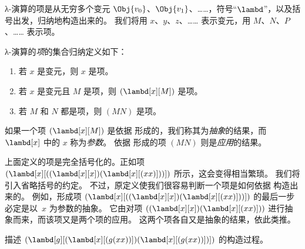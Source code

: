\documentclass[../../../include/open-logic-section]{subfiles}
\begin{document}

λ-演算的项是从无穷多个变元 $\Obj{v_0}$、$\Obj{v_1}$、……，符号“$\lambd$”，以及括号出发，归纳地构造出来的。
我们将用 $x$、$y$、$z$、…… 表示变元，用 $M$、$N$、$P$、…… 表示项。

\begin{defn}[项] 
λ-演算的\emph{项}的集合归纳定义如下：
\begin{enumerate}
  \item {} 若 $x$ 是变元，则 $x$ 是项。
  \item {} 若 $x$ 是变元且 $M$ 是项，则 $(\lambd[x][M])$ 是项。
  \item {} 若 $M$ 和 $N$ 都是项，则 $(MN)$ 是项。
\end{enumerate}
\end{defn}

如果一个项 $(\lambd[x][M])$ 是依据  形成的，我们称其为\emph{抽象}的结果，而 $\lambd[x]$ 中的 $x$ 称为\emph{参数}。
依据  形成的项 $(MN)$ 则是\emph{应用}的结果。

上面定义的项是完全括号化的。正如项
$(\lambd[x][((\lambd[x][x])(\lambd[x][(xx)]))])$ 所示，这会变得相当繁琐。
我们将引入省略括号的约定。
不过，原定义使我们很容易判断一个项是如何依据  构造出来的。
例如，形成项 $(\lambd[x][((\lambd[x][x])(\lambd[x][(xx)]))])$ 的最后一步必定是以~$x$ 为参数的抽象。
它由对项 $((\lambd[x][x])(\lambd[x][(xx)]))$ 进行抽象而来，而该项又是两个项的应用。
这两个项各自又是抽象的结果，依此类推。

\begin{prob}
描述 $(\lambd[g][(\lambd[x][(g (x x))])
  (\lambd[x][(g (x x))])])$ 的构造过程。
\end{prob}
\end{document}
